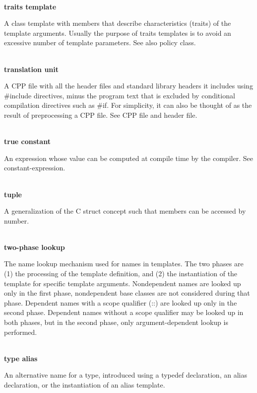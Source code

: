 \hspace*{\fill} \\ %
\noindent
\textbf{traits template}

A class template with members that describe characteristics (traits) of the template arguments. Usually the purpose of traits templates is to avoid an excessive number of template parameters. See also policy class.

\hspace*{\fill} \\ %
\noindent
\textbf{translation unit}

A CPP file with all the header files and standard library headers it includes using \#include directives, minus the program text that is excluded by conditional compilation directives such as \#if. For simplicity, it can also be thought of as the result of preprocessing a CPP file. See CPP file and header file.

\hspace*{\fill} \\ %
\noindent
\textbf{true constant}

An expression whose value can be computed at compile time by the compiler. See constant-expression.

\hspace*{\fill} \\ %
\noindent
\textbf{tuple}

A generalization of the C struct concept such that members can be accessed by number.

\hspace*{\fill} \\ %
\noindent
\textbf{two-phase lookup}

The name lookup mechanism used for names in templates. The two phases are (1) the processing of the template definition, and (2) the instantiation of the template for specific template arguments. Nondependent names are looked up only in the first phase, nondependent base classes are not considered during that phase. Dependent names with a scope qualifier (::) are looked up only in the second phase. Dependent names without a scope qualifier may be looked up in both phases, but in the second phase, only argument-dependent lookup is performed.

\hspace*{\fill} \\ %
\noindent
\textbf{type alias}

An alternative name for a type, introduced using a typedef declaration, an alias declaration, or the instantiation of an alias template.

